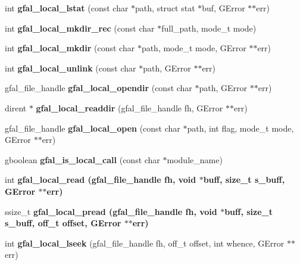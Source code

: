\begin{CompactItemize}
\item 
int \textbf{gfal\_\-local\_\-lstat} (const char $\ast$path, struct stat $\ast$buf, GError $\ast$$\ast$err)\label{gfal__posix__local__file_8c_5ad87b117d838e861e51a0999307cc71}

\item 
int \textbf{gfal\_\-local\_\-mkdir\_\-rec} (const char $\ast$full\_\-path, mode\_\-t mode)\label{gfal__posix__local__file_8c_4cb0dd1292a24921b9f693a836dc5771}

\item 
int \textbf{gfal\_\-local\_\-mkdir} (const char $\ast$path, mode\_\-t mode, GError $\ast$$\ast$err)\label{gfal__posix__local__file_8c_29c13ce3294eab970124d188fab1c567}

\item 
int \textbf{gfal\_\-local\_\-unlink} (const char $\ast$path, GError $\ast$$\ast$err)\label{gfal__posix__local__file_8c_4c00224b96c79f922500d9dc6a8d0a2c}

\item 
gfal\_\-file\_\-handle \textbf{gfal\_\-local\_\-opendir} (const char $\ast$path, GError $\ast$$\ast$err)\label{gfal__posix__local__file_8c_56dc809549c9ff1f7f245619fae1dea5}

\item 
dirent $\ast$ \textbf{gfal\_\-local\_\-readdir} (gfal\_\-file\_\-handle fh, GError $\ast$$\ast$err)\label{gfal__posix__local__file_8c_62b4c61d92b03111251803bc1f0a56b5}

\item 
gfal\_\-file\_\-handle \textbf{gfal\_\-local\_\-open} (const char $\ast$path, int flag, mode\_\-t mode, GError $\ast$$\ast$err)\label{gfal__posix__local__file_8c_b596322ecc96fdc80c6c21802483f1d4}

\item 
gboolean \textbf{gfal\_\-is\_\-local\_\-call} (const char $\ast$module\_\-name)\label{gfal__posix__local__file_8c_41bf6452e794fbfd86b1cfd95fe61f5b}

\item 
int \bf{gfal\_\-local\_\-read} (gfal\_\-file\_\-handle fh, void $\ast$buff, size\_\-t s\_\-buff, GError $\ast$$\ast$err)
\item 
ssize\_\-t \bf{gfal\_\-local\_\-pread} (gfal\_\-file\_\-handle fh, void $\ast$buff, size\_\-t s\_\-buff, off\_\-t offset, GError $\ast$$\ast$err)
\item 
int \textbf{gfal\_\-local\_\-lseek} (gfal\_\-file\_\-handle fh, off\_\-t offset, int whence, GError $\ast$$\ast$err)\label{gfal__posix__local__file_8c_3e1930273b0fa1021de561b1f1598f4a}


\end{CompactItemize}
